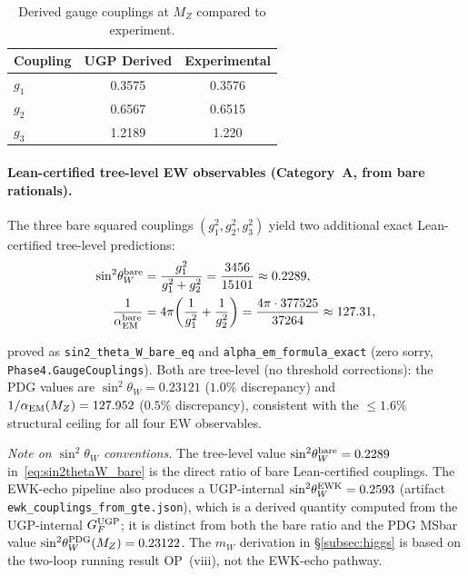 \documentclass[11pt]{article}
\theoremstyle{remark}
\begin{document}
\begin{table}[H]
\centering
\caption{Derived gauge couplings at $M_Z$ compared to experiment.}
\label{tab:gauge_summary}
\renewcommand{\arraystretch}{1.15}
\small
\begin{tabular}{@{}l c c@{}}
\toprule
\textbf{Coupling} & \textbf{UGP Derived} & \textbf{Experimental} \\
\midrule
$g_1$ & 0.3575 & 0.3576 \\
$g_2$ & 0.6567 & 0.6515 \\
$g_3$ & 1.2189 & 1.220 \\
\bottomrule
\end{tabular}
\end{table}


\paragraph{Lean-certified tree-level EW observables (Category~A, from bare rationals).}
The three bare squared couplings $(g_1^2, g_2^2, g_3^2)$ yield two additional exact Lean-certified tree-level predictions:
\begin{align}
  \sin^2\!\theta_W^{\rm bare} &= \frac{g_1^2}{g_1^2 + g_2^2}
    = \frac{3456}{15101} \approx 0.2289,
  \label{eq:sin2thetaW_bare} \\
  \frac{1}{\alpha_{\rm EM}^{\rm bare}} &= 4\pi\!\left(\frac{1}{g_1^2} + \frac{1}{g_2^2}\right)
    = \frac{4\pi \cdot 377525}{37264} \approx 127.31,
  \label{eq:alpha_em_bare}
\end{align}
\begin{sloppypar}
proved as \texttt{sin2\_theta\_W\_bare\_eq} and \texttt{alpha\_em\_formula\_exact}
(zero sorry, \texttt{Phase4.GaugeCouplings}).
Both are tree-level (no threshold corrections): the PDG values are $\sin^2\!\theta_W = 0.23121$ ($1.0\%$ discrepancy) and $1/\alpha_{\rm EM}(M_Z) = 127.952$ ($0.5\%$ discrepancy), consistent with the $\le 1.6\%$ structural ceiling for all four EW observables.
\end{sloppypar}

\smallskip
\noindent\emph{Note on $\sin^2\!\theta_W$ conventions.}  The tree-level value $\sin^2\!\theta_W^{\rm bare} = 0.2289$ in~\eqref{eq:sin2thetaW_bare} is the direct ratio of bare Lean-certified couplings.  The EWK-echo pipeline also produces a UGP-internal $\sin^2\!\theta_W^{\rm EWK} = 0.2593$ (artifact \texttt{ewk\_couplings\_from\_gte.json}), which is a derived quantity computed from the UGP-internal $G_F^{\rm UGP}$; it is distinct from both the bare ratio and the PDG MSbar value $\sin^2\!\theta_W^{\rm PDG}(M_Z) = 0.23122$.  The $m_W$ derivation in \S\ref{subsec:higgs} is based on the two-loop running result OP~(viii), not the EWK-echo pathway.
\end{document}
